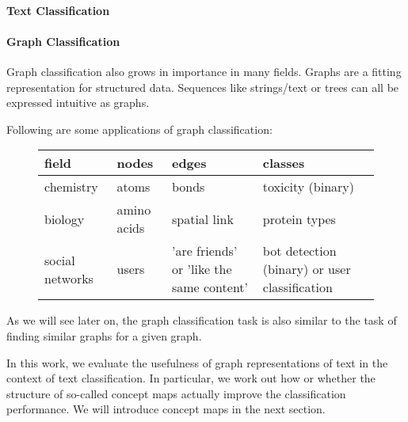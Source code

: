 

\paragraph{Text Classification}

\paragraph{Graph Classification}
Graph classification also grows in importance in many fields.
Graphs are a fitting representation for structured data.
Sequences like strings/text or trees can all be expressed intuitive as graphs.

Following are some applications of graph classification:

\begin{figure}[ht]
\centering
\begin{tabular}{llll}
field & nodes & edges & classes \\
\midrule
chemistry & atoms & bonds & toxicity (binary) \\
biology & amino acids & spatial link & protein types \\ 
social networks & users & 'are friends' or 'like the same content' & bot detection (binary) or user classification
\end{tabular}
\end{figure}

As we will see later on, the graph classification task is also similar to the task of finding similar graphs for a given graph.

In this work, we evaluate the usefulness of graph representations of text in the context of text classification. In particular, we work out how or whether the structure of so-called concept maps actually improve the classification performance.
We will introduce concept maps in the next section.

